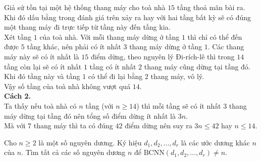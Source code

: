 \begin{ex}
{		Giả sử tồn tại một hệ thống thang máy cho toà nhà $15$ tầng thoả mãn bài ra. Khi đó dấu bằng trong đánh giá trên xảy ra hay với hai tầng bất kỳ sẽ có đúng một thang máy đi trực tiếp từ tầng này đến tầng kia.\\
		Xét tầng $1$ của toà nhà. Với mỗi thang máy dừng ở tầng $1$ thì chỉ có thể đến được $5$ tầng khác, nên phải có ít nhất $3$ thang máy dừng ở tầng $1$. Các thang máy này sẽ có ít nhất là $15$ điểm dừng, theo nguyên lý Đi-rích-lê thì trong $14$ tầng còn lại sẽ có ít nhất $1$ tầng có ít nhất $2$ thang máy cũng dừng tại tầng đó. Khi đó tầng này và tầng $1$ có thể đi lại bằng $2$ thang máy, vô lý.\\
		Vậy số tầng của toà nhà không vượt quá $14$.\\
		\textbf{Cách 2.}\\
		Ta thấy nếu toà nhà có $n$ tầng (với $n\ge 14$) thì mỗi tầng sẽ có ít nhất $3$ thang máy dừng tại tầng đó nên tổng số điểm dừng ít nhất là $3n$.\\
		Mà với $7$ thang máy thì ta có đúng $42$ điểm dừng nên suy ra $3n\le 42$ hay $n\le 14$.
	}
\end{ex}

\begin{ex}%
	Cho $n\ge 2$ là một số nguyên dương. Ký hiệu $d_1,d_2,\ldots,d_r$ là các ước dương khác $n$ của $n$. Tìm tất cả các số nguyên dương $n$ để $\text{BCNN}\left(d_1,d_2,\ldots,d_r\right)\ne n$.
\end{ex}

